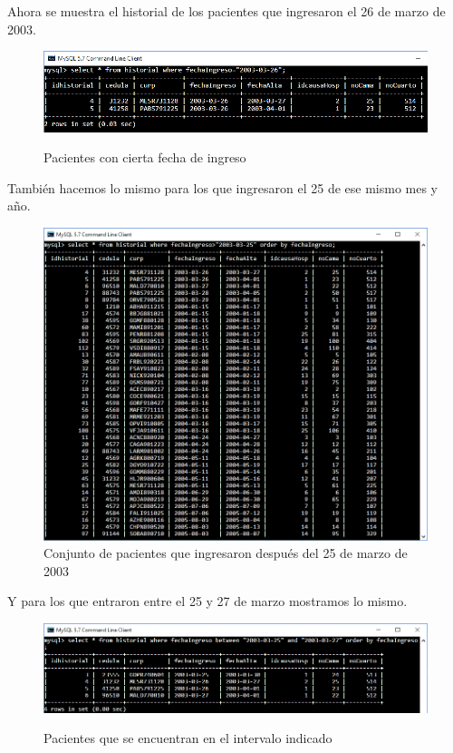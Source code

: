\documentclass[12pt, titlepage]{article}
\begin{document}
	Ahora se muestra el historial de los pacientes que ingresaron el 26 de marzo de 2003.
	\begin{figure}[H]
		\begin{center}
			\includegraphics[width=\textwidth]{img/doce.png}
			\label{fig:doce}
			\caption{Pacientes con cierta fecha de ingreso}
		\end{center}
	\end{figure}
	También hacemos lo mismo para los que ingresaron el 25 de ese mismo mes y año.
	\begin{figure}[H]
		\begin{center}
			\includegraphics[width=\textwidth]{img/trece.png}
			\caption{Conjunto de pacientes que ingresaron después del 25 de marzo de 2003}
			\label{fig:trece}
		\end{center}
	\end{figure}
	Y para los que entraron entre el 25 y 27 de marzo mostramos lo mismo.
	\begin{figure}[H]
		\begin{center}
			\includegraphics[width=\textwidth]{img/catorce.png}
			\label{fig:catorce}
			\caption{Pacientes que se encuentran en el intervalo indicado}
		\end{center}
	\end{figure}
\end{document}
